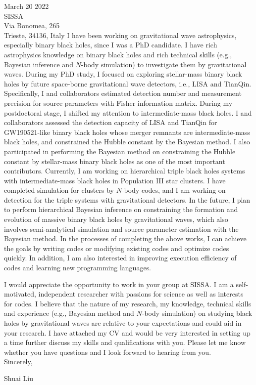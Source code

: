 \documentclass[11pt,a4paper,sans]{letter} %
\begin{document}
\begin{letter}{March 20 2022 \\
SISSA \\
Via Bonomea, 265 \\ 
Trieste, 34136, Italy}
I have been working on gravitational wave astrophysics, especially binary black holes, since I was a PhD candidate. I
    have rich astrophysics knowledge on binary black holes and rich technical skills (e.g., Bayesian inference and
    $N$-body simulation) to investigate them by
    gravitational waves. During my PhD study, I focused on exploring stellar-mass binary black holes by future
    space-borne gravitational wave detectors, i.e., LISA and TianQin. Specifically, I and collaborators estimated detection number and
    measurement precision for source parameters with Fisher information matrix. During my postdoctoral stage, I shifted
    my attention to intermediate-mass black holes. I and collaborators assessed the detection capacity of LISA and TianQin
    for GW190521-like binary black holes whose merger remnants are intermediate-mass black holes, and constrained the
    Hubble constant by the Bayesian method. I also participated in performing the Bayesian method on constraining the Hubble
    constant by stellar-mass binary black holes as one of the most important contributors. Currently, I am working on
    hierarchical triple
    black holes systems with intermediate-mass black holes in Population III star clusters. I have completed simulation for
    clusters by $N$-body codes, and I am working on detection for the triple systems with gravitational detectors.  
    In the future, I plan to perform hierarchical Bayesian inference on constraining the formation and evolution of massive binary black holes by gravitational waves,
    which also involves semi-analytical simulation and source parameter estimation with the Bayesian method. In the processes of
    completing the above works, I can achieve the goals by writing codes or modifying existing codes and optimize codes
    quickly. In addition, I am also interested in improving execution efficiency of codes and learning new programming
    languages. 

I would appreciate the opportunity to work in your group at SISSA. I am a self-motivated, independent researcher with
    passions for science as well as interests for codes. I believe that the nature of my research, my knowledge,
    technical skills and experience (e.g., Bayesian method and $N$-body simulation) on studying black holes by
    gravitational waves are relative to your expectations and could aid in your research. I have attached my CV and would be very interested in setting up a time further
discuss my skills and qualifications with you. Please let me know whether you have questions and I look forward to
hearing from you.\\

Sincerely,

Shuai Liu




\end{letter}
\end{document}
